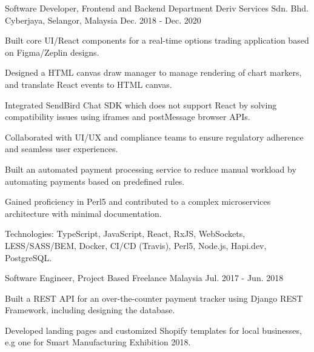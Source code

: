 \begin{cventries}
  \cventry
    {Software Developer, Frontend and Backend Department} %
    {Deriv Services Sdn. Bhd.} %
    {Cyberjaya, Selangor, Malaysia} %
    {Dec. 2018 - Dec. 2020} %
    {
      \begin{cvitems} %
        \item {Built core UI/React components for a real-time options trading application based on Figma/Zeplin designs.}
        \item {Designed a HTML canvas draw manager to manage rendering of chart markers, and translate React events to HTML canvas.}
        \item {Integrated SendBird Chat SDK which does not support React by solving compatibility issues using iframes and postMessage browser APIs.}
        \item {Collaborated with UI/UX and compliance teams to ensure regulatory adherence and seamless user experiences.}
        \item {Built an automated payment processing service to reduce manual workload by automating payments based on predefined rules.}
        \item {Gained proficiency in Perl5 and contributed to a complex microservices architecture with minimal documentation.}
        \item {Technologies: TypeScript, JavaScript, React, RxJS, WebSockets, LESS/SASS/BEM, Docker, CI/CD (Travis), Perl5, Node.js, Hapi.dev, PostgreSQL.}
      \end{cvitems}
    }

  \cventry
    {Software Engineer, Project Based} %
    {Freelance} %
    {Malaysia} %
    {Jul. 2017 - Jun. 2018} %
    {
      \begin{cvitems} %
        \item {Built a REST API for an over-the-counter payment tracker using Django REST Framework, including designing the database.}
        \item {Developed landing pages and customized Shopify templates for local businesses, e.g one for Smart Manufacturing Exhibition 2018.}
      \end{cvitems}
    }

\end{cventries}
